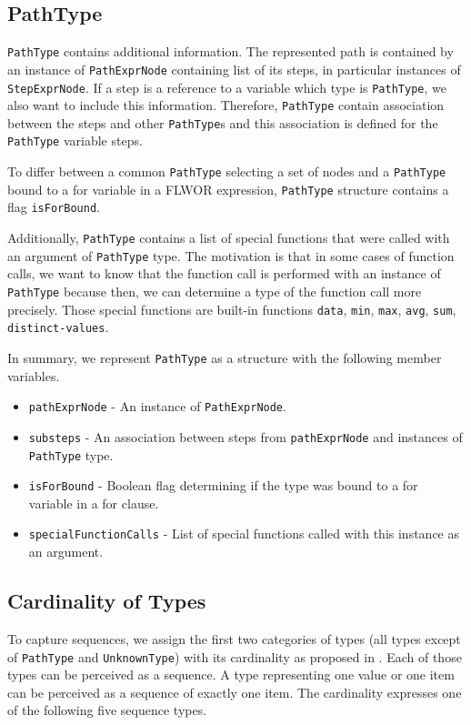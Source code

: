 \subsection{PathType}
\texttt{PathType} contains additional information. The represented path is contained by an instance of \texttt{PathExprNode} containing list of its steps, in particular instances of \texttt{StepExprNode}. If a step is a reference to a variable which type is \texttt{PathType}, we also want to include this information. Therefore, \texttt{PathType} contain association between the steps and other \texttt{PathType}s and this association is defined for the \texttt{PathType} variable steps.

To differ between a common \texttt{PathType} selecting a set of nodes and a \texttt{PathType} bound to a for variable in a FLWOR expression, \texttt{PathType} structure contains a flag \texttt{isForBound}.

Additionally, \texttt{PathType} contains a list of special functions that were called with an argument of \texttt{PathType} type. The motivation is that in some cases of function calls, we want to know that the function call is performed with an instance of \texttt{PathType} because then, we can determine a type of the function call more precisely. Those special functions are built-in functions \texttt{data}, \texttt{min}, \texttt{max}, \texttt{avg}, \texttt{sum}, \texttt{distinct-values}.

In summary, we represent \texttt{PathType} as a structure with the following member variables.
\begin{itemize}
\item \texttt{pathExprNode} - An instance of \texttt{PathExprNode}.
\item \texttt{substeps} - An association between steps from \texttt{pathExprNode} and instances of \texttt{PathType} type.
\item \texttt{isForBound} - Boolean flag determining if the type was bound to a for variable in a for clause.
\item \texttt{specialFunctionCalls} - List of special functions called with this instance as an argument.
\end{itemize}

\subsection{Cardinality of Types}

To capture sequences, we assign the first two categories of types (all types except of \texttt{PathType} and \texttt{UnknownType}) with its cardinality as proposed in \cite{thesis_schejbal}. Each of those types can be perceived as a sequence. A type representing one value or one item can be perceived as a sequence of exactly one item. The cardinality expresses one of the following five sequence types.

